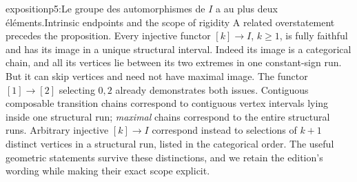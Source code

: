 \begin{dcomment}{exposition}{p5:Le groupe des automorphismes de $I$ a au plus deux éléments.}{Intrinsic endpoints and the scope of rigidity}
A related overstatement precedes the proposition. Every injective functor $[k]\to I$, $k\geq1$, is fully faithful and has its image in a unique structural interval. Indeed its image is a categorical chain, and all its vertices lie between its two extremes in one constant-sign run. But it can skip vertices and need not have maximal image. The functor $[1]\to[2]$ selecting $0,2$ already demonstrates both issues. Contiguous composable transition chains correspond to contiguous vertex intervals lying inside one structural run; \emph{maximal} chains correspond to the entire structural runs. Arbitrary injective $[k]\to I$ correspond instead to selections of $k+1$ distinct vertices in a structural run, listed in the categorical order. The useful geometric statements survive these distinctions, and we retain the edition's wording while making their exact scope explicit.
\end{dcomment}

